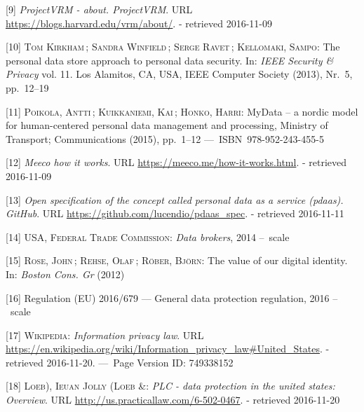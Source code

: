 \documentclass[12pt,english,a4paper,titlepage,cleardoublepage=empty,dottedtoc]{report}
\begin{document}
\hypertarget{ref-web_2010_projectvrm_about}{}
{[}9{]} \emph{ProjectVRM - about. ProjectVRM}. URL
\url{https://blogs.harvard.edu/vrm/about/}. - retrieved 2016-11-09

\hypertarget{ref-paper_2013_the-personal-data-store-approach-to-personal-data-security_2013}{}
{[}10{]} \textsc{Tom Kirkham}\,; \textsc{Sandra Winfield}\,;
\textsc{Serge Ravet}\,; \textsc{Kellomaki, Sampo}: The personal data
store approach to personal data security. In: \emph{IEEE Security \&
Privacy} vol. 11. Los Alamitos, CA, USA, IEEE Computer Society (2013),
Nr.~5, pp.~12--19

\hypertarget{ref-whitepaper_2014_mydata-a-nordic-model-for-human-centered-personal-data-management-and-processing}{}
{[}11{]} \textsc{Poikola, Antti}\,; \textsc{Kuikkaniemi, Kai}\,;
\textsc{Honko, Harri}: MyData -- a nordic model for human-centered
personal data management and processing, Ministry of Transport;
Communications (2015), pp.~1--12 ---~ISBN~978-952-243-455-5

\hypertarget{ref-web_2016_meeco-how-it-works}{}
{[}12{]} \emph{Meeco how it works}. URL
\url{https://meeco.me/how-it-works.html}. - retrieved 2016-11-09

\hypertarget{ref-repo_2016_pdaas-spec}{}
{[}13{]} \emph{Open specification of the concept called personal data as
a service (pdaas). GitHub}. URL
\url{https://github.com/lucendio/pdaas_spec}. - retrieved 2016-11-11

\hypertarget{ref-report_2014_data-brokers}{}
{[}14{]} \textsc{USA, Federal Trade Commission}: \emph{Data brokers},
2014 --~scale

\hypertarget{ref-whitepaper_2012_the-value-of-our-digital-identity_definition}{}
{[}15{]} \textsc{Rose, John}\,; \textsc{Rehse, Olaf}\,; \textsc{Röber,
Björn}: The value of our digital identity. In: \emph{Boston Cons. Gr}
(2012)

\hypertarget{ref-regulation_2016_eu_general-data-protection-regulation_definition}{}
{[}16{]} Regulation (EU) 2016/679 --- General data protection
regulation, 2016 --~scale

\hypertarget{ref-web_2016_wikipedia_information-privacy-law_us}{}
{[}17{]} \textsc{Wikipedia}: \emph{Information privacy law}. URL
\url{https://en.wikipedia.org/wiki/Information_privacy_law\#United_States}.
- retrieved 2016-11-20. ---~Page Version ID: 749338152

\hypertarget{ref-web_2016_data-protection-laws-in-the-us}{}
{[}18{]} \textsc{Loeb), Ieuan Jolly (Loeb \&}: \emph{PLC - data
protection in the united states: Overview}. URL
\url{http://us.practicallaw.com/6-502-0467}. - retrieved 2016-11-20
\end{document}
